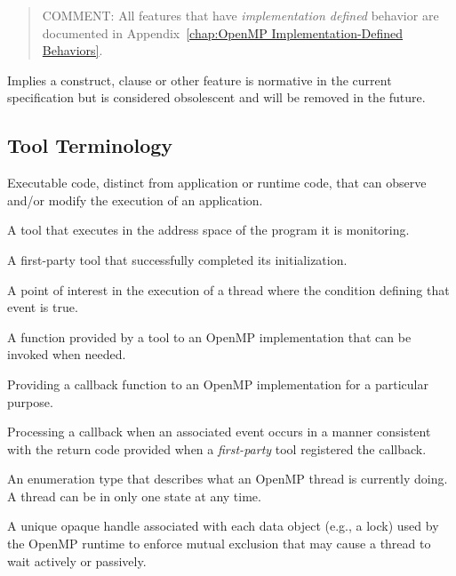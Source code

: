 \begin{quote}
COMMENT: All features that have \emph{implementation defined} behavior 
are documented in Appendix~\ref{chap:OpenMP Implementation-Defined Behaviors}.
\end{quote}
\glossarydefend

\glossarydefstart
Implies a construct, clause or other feature is normative in the current specification but is considered obsolescent and will be removed in the future.
\glossarydefend

\subsection{Tool Terminology}

\glossarydefstart
Executable code, distinct from application or runtime code, that can observe and/or modify the execution of an application.
\glossarydefend

\glossarydefstart
A tool that executes in the address space of the program it is monitoring.
\glossarydefend



\glossarydefstart
A first-party tool that successfully completed its initialization.
\glossarydefend

\glossarydefstart
A point of interest in the execution of a thread where the condition
defining that event is true. 
\glossarydefend

\glossarydefstart
A function provided by a tool to an OpenMP implementation that can be invoked when needed.
\glossarydefend

\glossarydefstart
Providing a callback function to an OpenMP implementation for a particular purpose.
\glossarydefend

\glossarydefstart
Processing a callback when an associated event occurs in a manner consistent with the return code
provided when a \emph{first-party} tool registered the callback.
\glossarydefend

\glossarydefstart
An enumeration type that describes what an OpenMP thread is currently doing.  
A thread can be in only one state at any time.
\glossarydefend

\glossarydefstart
A unique opaque handle associated with each data object (e.g., a lock) used by the OpenMP runtime
to enforce mutual exclusion that may cause a thread to wait actively or passively.
\glossarydefend

